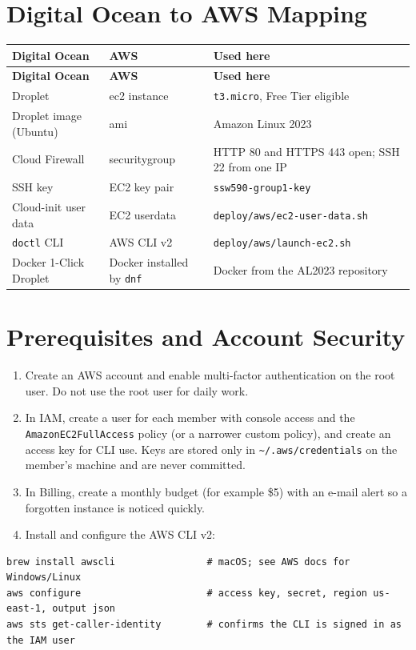 \section{Digital Ocean to AWS Mapping}
\begin{tabularx}{\linewidth}{L{3.6cm}L{4.4cm}Y}
\caption{Digital Ocean Concepts and Their AWS Equivalents\label{Table:DOtoAWS}}\\
\toprule \textbf{Digital Ocean} & \textbf{AWS} & \textbf{Used here}\\ \midrule
\endfirsthead
\toprule \textbf{Digital Ocean} & \textbf{AWS} & \textbf{Used here}\\ \midrule
\endhead \bottomrule \endlastfoot
Droplet & \gls{ec2} instance & \texttt{t3.micro}, Free Tier eligible\\
Droplet image (Ubuntu) & \gls{ami} & Amazon Linux 2023\\
Cloud Firewall & \gls{securitygroup} & HTTP 80 and HTTPS 443 open; SSH 22 from one IP\\
SSH key & EC2 key pair & \texttt{ssw590-group1-key}\\
Cloud-init user data & EC2 \gls{userdata} & \texttt{deploy/aws/ec2-user-data.sh}\\
\texttt{doctl} CLI & AWS CLI v2 & \texttt{deploy/aws/launch-ec2.sh}\\
Docker 1-Click Droplet & Docker installed by \texttt{dnf} & Docker from the AL2023 repository\\
\end{tabularx}

\section{Prerequisites and Account Security}
\begin{enumerate}
\item Create an AWS account and enable multi-factor authentication on the root
user. Do not use the root user for daily work.
\item In IAM, create a user for each member with console access and the
\texttt{AmazonEC2FullAccess} policy (or a narrower custom policy), and create an
access key for CLI use. Keys are stored only in \texttt{\textasciitilde/.aws/credentials}
on the member's machine and are never committed.
\item In Billing, create a monthly budget (for example \$5) with an e-mail
alert so a forgotten instance is noticed quickly.
\item Install and configure the AWS CLI v2:
\end{enumerate}
\begin{verbatim}
brew install awscli                # macOS; see AWS docs for Windows/Linux
aws configure                      # access key, secret, region us-east-1, output json
aws sts get-caller-identity        # confirms the CLI is signed in as the IAM user
\end{verbatim}

